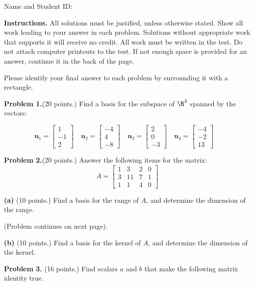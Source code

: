 \documentclass[12pt]{article}
\begin{document}
Name and Student ID: \hrulefill


\textbf{Instructions.} All solutions must be justified, unless otherwise stated. Show all work leading to your answer in each problem. Solutions without appropriate work that supports it will receive no credit. All work must be written in the test. Do not attach computer printouts to the test. If not enough space is provided for an answer, continue it in the back of the page.

Please identify your final answer to each problem by surrounding it with a rectangle.


\clearpage


\textbf{Problem 1.}(20 points.) 
Find a basis for the subspace of $\R^3$ spanned by the vectors:

$$
\mathbf{u}_1=\left[\begin{matrix}1\\-1\\2\end{matrix}\right]\quad
\mathbf{u}_2=\left[\begin{matrix}-4\\4\\-8\end{matrix}\right]\quad
\mathbf{u}_3=\left[\begin{matrix}2\\0\\-3\end{matrix}\right]\quad
\mathbf{u}_4=\left[\begin{matrix}-4\\-2\\13\end{matrix}\right]\quad
$$
\clearpage

\textbf{Problem 2.}(20 points.)
Answer the following items for the matrix:
\[
A=
\begin{bmatrix}1&3&2&0\\3&11&7&1\\1&1&4&0\end{bmatrix}
\] 

\textbf{(a)} (10 points.) Find a basis for the range of $A$, and determine the dimension of the range.

\vfill
(Problem continues on next page).
\clearpage

\textbf{(b)} (10 points.) Find a basis for the kernel of $A$, and determine the dimension of the kernel.

\clearpage

\textbf{Problem 3.} (16 points.) Find scalars $a$ and $b$ that make the following matrix identity true.
\end{document}
